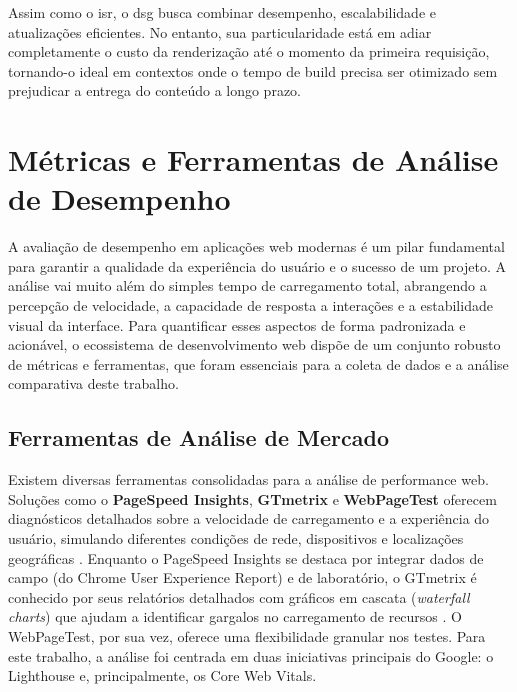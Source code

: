 Assim como o \acrshort{isr}, o \acrshort{dsg} busca combinar desempenho, escalabilidade e atualizações eficientes. No entanto, sua particularidade está em adiar completamente o custo da renderização até o momento da primeira requisição, tornando-o ideal em contextos onde o tempo de build precisa ser otimizado sem prejudicar a entrega do conteúdo a longo prazo.

















\section{Métricas e Ferramentas de Análise de Desempenho}
\label{sec:metricas-e-ferramentas}
A avaliação de desempenho em aplicações web modernas é um pilar fundamental para garantir a qualidade da experiência do usuário e o sucesso de um projeto. A análise vai muito além do simples tempo de carregamento total, abrangendo a percepção de velocidade, a capacidade de resposta a interações e a estabilidade visual da interface. Para quantificar esses aspectos de forma padronizada e acionável, o ecossistema de desenvolvimento web dispõe de um conjunto robusto de métricas e ferramentas, que foram essenciais para a coleta de dados e a análise comparativa deste trabalho.

\subsection{Ferramentas de Análise de Mercado}
\label{subsec:ferramentas-analise}
Existem diversas ferramentas consolidadas para a análise de performance web. Soluções como o \textbf{PageSpeed Insights}, \textbf{GTmetrix} e \textbf{WebPageTest} oferecem diagnósticos detalhados sobre a velocidade de carregamento e a experiência do usuário, simulando diferentes condições de rede, dispositivos e localizações geográficas \cite{webabsoluta_ferramentas}. Enquanto o PageSpeed Insights se destaca por integrar dados de campo (do Chrome User Experience Report) e de laboratório, o GTmetrix é conhecido por seus relatórios detalhados com gráficos em cascata (\textit{waterfall charts}) que ajudam a identificar gargalos no carregamento de recursos \cite{gtmetrix_vitals}. O WebPageTest, por sua vez, oferece uma flexibilidade granular nos testes. Para este trabalho, a análise foi centrada em duas iniciativas principais do Google: o Lighthouse e, principalmente, os Core Web Vitals.

